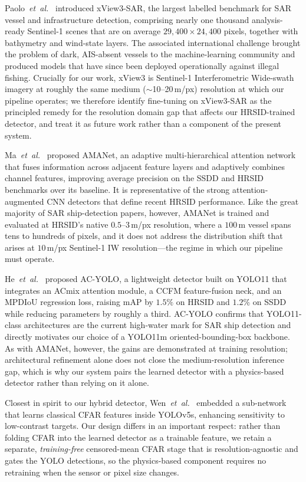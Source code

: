 \documentclass[a4paper,11pt]{article}
\begin{document}
Paolo~\textit{et~al.}~\cite{paolo2022xview3} introduced xView3-SAR, the largest
labelled benchmark for SAR vessel and infrastructure detection, comprising nearly one
thousand analysis-ready Sentinel-1 scenes that are on average $29{,}400\times24{,}400$
pixels, together with bathymetry and wind-state layers. The associated international
challenge brought the problem of dark, AIS-absent vessels to the machine-learning
community and produced models that have since been deployed operationally against
illegal fishing. Crucially for our work, xView3 is Sentinel-1 Interferometric
Wide-swath imagery at roughly the same medium ($\sim$10--20\,m/px) resolution at which
our pipeline operates; we therefore identify fine-tuning on xView3-SAR as the
principled remedy for the resolution domain gap that affects our HRSID-trained
detector, and treat it as future work rather than a component of the present system.

Ma~\textit{et~al.}~\cite{ma2024amanet} proposed AMANet, an adaptive
multi-hierarchical attention network that fuses information across adjacent feature
layers and adaptively combines channel features, improving average precision on the
SSDD and HRSID benchmarks over its baseline. It is representative of the strong
attention-augmented CNN detectors that define recent HRSID performance. Like the great
majority of SAR ship-detection papers, however, AMANet is trained and evaluated at
HRSID's native $0.5$--$3$\,m/px resolution, where a $100$\,m vessel spans tens to
hundreds of pixels, and it does not address the distribution shift that arises at
$10$\,m/px Sentinel-1 IW resolution---the regime in which our pipeline must operate.

He~\textit{et~al.}~\cite{he2025acyolo} proposed AC-YOLO, a lightweight detector built
on YOLO11 that integrates an ACmix attention module, a CCFM feature-fusion neck, and an
MPDIoU regression loss, raising mAP by $1.5\%$ on HRSID and $1.2\%$ on SSDD while
reducing parameters by roughly a third. AC-YOLO confirms that YOLO11-class
architectures are the current high-water mark for SAR ship detection and directly
motivates our choice of a YOLO11m oriented-bounding-box backbone. As with AMANet,
however, the gains are demonstrated at training resolution; architectural refinement
alone does not close the medium-resolution inference gap, which is why our system pairs
the learned detector with a physics-based detector rather than relying on it alone.

Closest in spirit to our hybrid detector, Wen~\textit{et~al.}~\cite{wen2024cfaryolo}
embedded a sub-network that learns classical CFAR features inside YOLOv5s, enhancing
sensitivity to low-contrast targets. Our design differs in an important respect: rather
than folding CFAR into the learned detector as a trainable feature, we retain a
separate, \emph{training-free} censored-mean CFAR stage that is resolution-agnostic and
gates the YOLO detections, so the physics-based component requires no retraining when
the sensor or pixel size changes.
\end{document}
